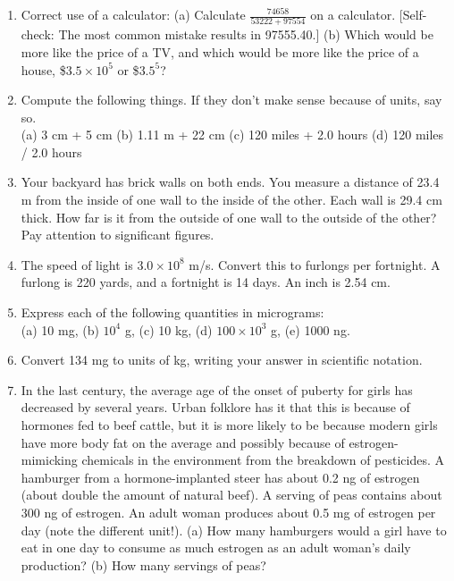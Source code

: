 \begin{enumerate}
\item  Correct use of a calculator: (a) Calculate $\frac{74658}{53222+97554}$ on a calculator.
[Self-check: The most common mistake results in 97555.40.] 
(b) Which would be more like the price of a TV, and which
would be more like the price of a house, \$$3.5\times10^5$  or \$$3.5^5$?


\item Compute the following things. If they don't make sense
because of units, say so.\\
(a) 3 cm + 5 cm 
(b) 1.11 m + 22 cm 
(c) 120 miles + 2.0 hours 
(d) 120 miles / 2.0 hours 


\item  Your backyard has brick walls on both ends. You measure a
distance of 23.4 m from the inside of one wall to the
inside of the other. Each wall is 29.4 cm thick. How far is
it from the outside of one wall to the outside of the other?
Pay attention to significant figures.


\item 
 The speed of light is $3.0\times10^8$  m/s. Convert
this to furlongs per fortnight.  A furlong is 220 yards, and
a fortnight is 14 days.  An inch is 2.54 cm.

\item
 Express each of the following quantities in micrograms:\\
(a) 10 mg, (b) $10^4$ g, (c) 10 kg, (d) $100 \times 10^3$ g, (e) 1000 ng.


\item Convert 134 mg to units of kg, writing your answer in
scientific notation.

\item 
 In the last century, the average age of the onset of
puberty for girls has decreased by several years. Urban
folklore has it that this is because of hormones fed to beef
cattle, but it is more likely to be because modern girls
have more body fat on the average and possibly because of
estrogen-mimicking chemicals in the environment from the
breakdown of pesticides. A hamburger from a hormone-implanted
steer has about 0.2 ng of estrogen (about double the amount
of natural beef). A serving of peas contains about 300 ng of
estrogen. An adult woman produces about 0.5 mg of estrogen
per day (note the different unit!). (a) How many hamburgers
would a girl have to eat in one day to consume as much
estrogen as an adult woman's daily production? (b) How
many servings of peas? 


\end{enumerate}
